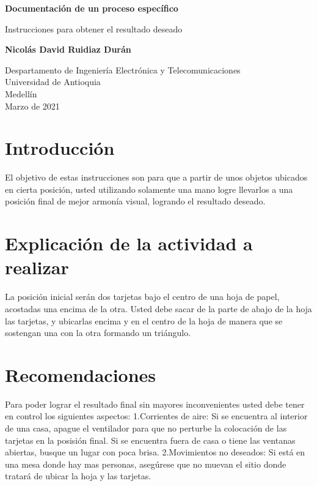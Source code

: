 \documentclass{article}
\begin{document}
\begin{titlepage}
    \begin{center}
        \vspace*{1cm}
            
        \Huge
        \textbf{Documentación de un proceso específico}
            
        \vspace{0.5cm}
        \LARGE
        Instrucciones para obtener el resultado deseado
            
        \vspace{1.5cm}
            
        \textbf{Nicolás David Ruidiaz Durán}
            
        \vfill
            
        \vspace{0.8cm}
            
        \Large
        Despartamento de Ingeniería Electrónica y Telecomunicaciones\\
        Universidad de Antioquia\\
        Medellín\\
        Marzo de 2021
            
    \end{center}
\end{titlepage}

\tableofcontents
\newpage
\section{Introducción}\label{intro}
El objetivo de estas instrucciones son para que a partir de unos objetos ubicados en cierta posición, usted utilizando solamente una mano logre llevarlos a una posición final de mejor armonía visual, logrando el resultado deseado.

\section{Explicación de la actividad a realizar}\label{explicación}
La posición inicial serán dos tarjetas bajo el centro de una hoja de papel, acostadas una encima de la otra. Usted debe sacar de la parte de abajo de la hoja las tarjetas, y ubicarlas encima y en el centro de la hoja de manera que se sostengan una con la otra formando un triángulo.

\section{Recomendaciones} \label{recomendaciones}
Para poder lograr el resultado final sin mayores inconvenientes usted debe tener en control los siguientes aspectos:
 1.Corrientes de aire: Si se encuentra al interior de una casa, apague el ventilador para que no perturbe la colocación de las tarjetas en la posisión final. Si se encuentra fuera de casa o tiene las ventanas abiertas, busque un lugar con poca brisa.
 2.Movimientos no deseados: Si está en una mesa donde hay mas personas, asegúrese que no muevan el sitio donde tratará de ubicar la hoja y las tarjetas.
\end{document}
